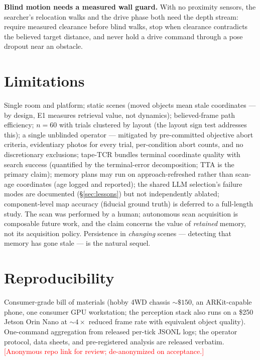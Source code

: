 \documentclass{article}
\newcommand{\todo}[1]{\textcolor{red}{[#1]}}
\begin{document}
\textbf{Blind motion needs a measured wall guard.} With no
proximity sensors, the searcher's relocation walks and the drive phase
both need the depth stream: require measured clearance before blind
walks, stop when clearance contradicts the believed target distance,
and never hold a drive command through a pose dropout near an obstacle.

\section{Limitations}

Single room and platform; static scenes (moved objects mean stale
coordinates --- by design, E1 measures retrieval value, not dynamics);
believed-frame path efficiency; $n{=}60$ with trials clustered by
layout (the layout sign test addresses this); a single unblinded
operator --- mitigated by pre-committed objective abort criteria,
evidentiary photos for every trial, per-condition abort counts, and no
discretionary exclusions; tape-TCR bundles terminal coordinate quality
with search success (quantified by the terminal-error decomposition;
TTA is the primary claim); memory plans may run on approach-refreshed
rather than scan-age coordinates (age logged and reported); the shared
LLM selection's failure modes are documented (\S\ref{sec:lessons}) but
not independently ablated; component-level map accuracy (fiducial
ground truth) is deferred to a full-length study. The scan was
performed by a human; autonomous scan acquisition is composable future
work, and the claim concerns the value of \emph{retained} memory, not
its acquisition policy. Persistence in \emph{changing} scenes ---
detecting that memory has gone stale --- is the natural sequel.

\section{Reproducibility}

Consumer-grade bill of materials (hobby 4WD chassis ${\sim}\$150$, an
ARKit-capable phone, one consumer GPU workstation; the perception stack
also runs on a \$250 Jetson Orin Nano at ${\sim}4\times$ reduced frame
rate with equivalent object quality). One-command aggregation from
released per-tick JSONL logs; the operator protocol, data sheets, and
pre-registered analysis are released verbatim. \todo{Anonymous repo
link for review; de-anonymized on acceptance.}



\end{document}
